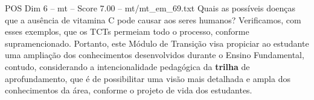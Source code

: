\begin{textsample}{POS Dim 6 – mt – Score 7.00 – mt/mt\_em\_69.txt}
Quais as possíveis doenças que a ausência de vitamina C pode causar aos seres humanos?
Verificamos, com esses exemplos, que os TCTs permeiam todo o processo, conforme supramencionado.
Portanto, este Módulo de Transição visa propiciar ao estudante uma ampliação dos conhecimentos desenvolvidos durante o Ensino Fundamental, contudo, considerando a intencionalidade pedagógica da \textbf{trilha} de aprofundamento, que é de possibilitar uma visão mais detalhada e ampla dos conhecimentos da área, conforme o projeto de vida dos estudantes.

\end{textsample}
